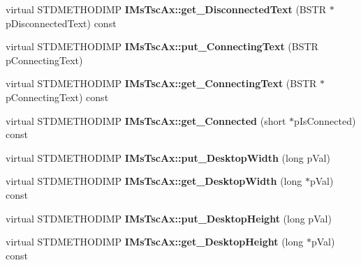 \begin{DoxyCompactItemize}
\mbox{\label{class_s_e_a_l_e_d___ad1f401b6b54a0d5395f0392a07a4a2b4}} 
virtual S\+T\+D\+M\+E\+T\+H\+O\+D\+I\+MP {\bfseries I\+Ms\+Tsc\+Ax\+::get\+\_\+\+Disconnected\+Text} (B\+S\+TR $\ast$p\+Disconnected\+Text) const
\item 
\mbox{\label{class_s_e_a_l_e_d___af30244ae15681a92ed209611d5907893}} 
virtual S\+T\+D\+M\+E\+T\+H\+O\+D\+I\+MP {\bfseries I\+Ms\+Tsc\+Ax\+::put\+\_\+\+Connecting\+Text} (B\+S\+TR p\+Connecting\+Text)
\item 
\mbox{\label{class_s_e_a_l_e_d___abcd32227863ab73ab465e965a8ce94b7}} 
virtual S\+T\+D\+M\+E\+T\+H\+O\+D\+I\+MP {\bfseries I\+Ms\+Tsc\+Ax\+::get\+\_\+\+Connecting\+Text} (B\+S\+TR $\ast$p\+Connecting\+Text) const
\item 
\mbox{\label{class_s_e_a_l_e_d___a8c88c3af19feb91d5b1a7cb35ade0324}} 
virtual S\+T\+D\+M\+E\+T\+H\+O\+D\+I\+MP {\bfseries I\+Ms\+Tsc\+Ax\+::get\+\_\+\+Connected} (short $\ast$p\+Is\+Connected) const
\item 
\mbox{\label{class_s_e_a_l_e_d___a8150b3f70b1fafb6722bd0bf36452754}} 
virtual S\+T\+D\+M\+E\+T\+H\+O\+D\+I\+MP {\bfseries I\+Ms\+Tsc\+Ax\+::put\+\_\+\+Desktop\+Width} (long p\+Val)
\item 
\mbox{\label{class_s_e_a_l_e_d___a16aaf8cf8f9d0b3b1eb3d45325864104}} 
virtual S\+T\+D\+M\+E\+T\+H\+O\+D\+I\+MP {\bfseries I\+Ms\+Tsc\+Ax\+::get\+\_\+\+Desktop\+Width} (long $\ast$p\+Val) const
\item 
\mbox{\label{class_s_e_a_l_e_d___a963bf8c7725e7c3ecc9ba48751d735fb}} 
virtual S\+T\+D\+M\+E\+T\+H\+O\+D\+I\+MP {\bfseries I\+Ms\+Tsc\+Ax\+::put\+\_\+\+Desktop\+Height} (long p\+Val)
\item 
\mbox{\label{class_s_e_a_l_e_d___a524146133cbe5aebc8877a52481ca449}} 
virtual S\+T\+D\+M\+E\+T\+H\+O\+D\+I\+MP {\bfseries I\+Ms\+Tsc\+Ax\+::get\+\_\+\+Desktop\+Height} (long $\ast$p\+Val) const
\item 
\mbox{\label{class_s_e_a_l_e_d___af0d7830b0f1e9936a9af02b2eb2be63d}} 

\end{DoxyCompactItemize}
